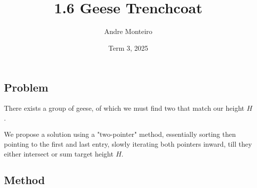 \documentclass[12pt]{article}
\title{1.6 Geese Trenchcoat}
\author{Andre Monteiro}
\date{Term 3, 2025}
\begin{document}
\maketitle
\newpage
\subsection*{Problem}
There exists a group of geese, of which we must find two that match our height $H$.

We propose a solution using a "two-pointer" method, essentially sorting then pointing to the first and last entry, slowly iterating both pointers inward, till they either intersect or sum target height $H$.

\subsection*{Method}
\end{document}
